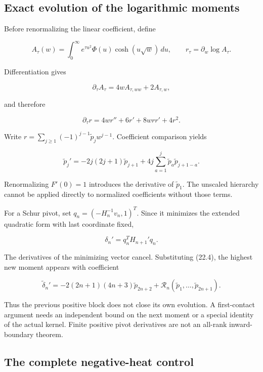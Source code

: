 \documentclass[
  10pt,
  a4paper,
  10pt,
  oneside,
  openany]{book}
\begin{document}
\subsection{Exact evolution of the logarithmic
moments}\label{exact-evolution-of-the-logarithmic-moments}

Before renormalizing the linear coefficient, define

\[
A_\tau(w)=\int_0^\infty e^{\tau u^2}\Phi(u)\cosh(u\sqrt w)\,du,
\qquad r_\tau=\partial_w\log A_\tau.
\tag{22.1}\label{eq:22.1}
\]

Differentiation gives

\[
\partial_\tau A_\tau=4wA_{\tau,ww}+2A_{\tau,w},
\tag{22.2}\label{eq:22.2}
\]

and therefore

\[
\partial_\tau r=4wr''+6r'+8wrr'+4r^2.
\tag{22.3}\label{eq:22.3}
\]

Write \(r=\sum_{j\ge1}(-1)^{j-1}\widetilde p_jw^{j-1}\). Coefficient
comparison yields

\[
\widetilde p_j'
=-2j(2j+1)\widetilde p_{j+1}
+4j\sum_{a=1}^{j}\widetilde p_a\widetilde p_{j+1-a}.
\tag{22.4}\label{eq:22.4}
\]

Renormalizing \(F'(0)=1\) introduces the derivative of
\(\widetilde p_1\). The unscaled hierarchy cannot be applied directly to
normalized coefficients without those terms.

For a Schur pivot, set \(q_n=(-H_n^{-1}v_n,1)^T\). Since it minimizes
the extended quadratic form with last coordinate fixed,

\[
\delta_n'=q_n^TH_{n+1}'q_n.
\tag{22.5}\label{eq:22.5}
\]

The derivatives of the minimizing vector cancel. Substituting (22.4),
the highest new moment appears with coefficient

\[
\widetilde\delta_n'
=-2(2n+1)(4n+3)\widetilde p_{2n+2}
+\mathcal R_n(\widetilde p_1,\ldots,\widetilde p_{2n+1}).
\tag{22.6}\label{eq:22.6}
\]

Thus the previous positive block does not close its own evolution. A
first-contact argument needs an independent bound on the next moment or
a special identity of the actual kernel. Finite positive pivot
derivatives are not an all-rank inward-boundary theorem.

\subsection{The complete negative-heat
control}\label{the-complete-negative-heat-control}
\end{document}
